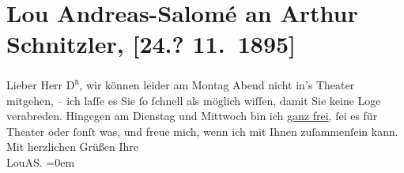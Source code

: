 

         \renewcommand{\erwaehnteOrte}{Orte: Wien}
         \renewcommand{\erwaehnteWerke}{}
               \section[Lou Andreas-Salomé an Arthur Schnitzler, {[}24.? 11. 1895{]}]{ Lou Andreas-Salomé an Arthur Schnitzler, {[}24.? 11. 1895{]}}\nopagebreak{}\rehead{ }\begin{ledgroupsized}[t]{13cm}\normalsize\beginnumbering \toendnotes[C]{\smallbreak\pagebreak[2]} 
\pstart
           \noindent{}{\pb}Lieber Herr \textsc{D\textsuperscript{r}}, wir können leider am Montag Abend nicht in’s Theater
               mitgehen, – ich laſſe es Sie ſo ſchnell als möglich wiſſen, damit Sie keine Loge
               verabreden. Hingegen am Dienstag und Mittwoch bin ich \uline{ganz frei}, ſei es für Theater oder ſonſt was, und
               freue mich, wenn ich mit Ihnen zuſammenſein kann.\pend
           \pstart
           Mit herzlichen Grüßen Ihre{\\[\baselineskip]}\spacefill\mbox{LouAS.}\pend
           \leftskip=0em{}
         
         \endnumbering{}\end{ledgroupsized}  \newcommand{\dateiname}{L00515}\newcommand{\titel}{Lou Andreas-Salomé an Arthur Schnitzler, [24.? 11. 1895]}\newcommand{\editorInnen}{Martin Anton Müller und Gerd-Hermann Susen}
      